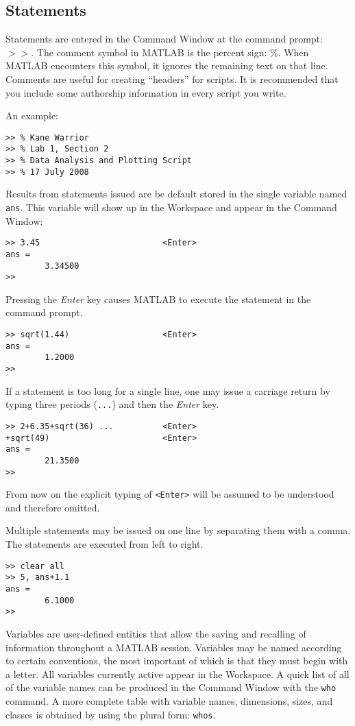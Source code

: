 \subsection{Statements}
Statements are entered in the Command Window at the command prompt: $>>$.  The comment symbol in MATLAB is the percent sign: \%.  When MATLAB encounters this symbol, it ignores the remaining text on that line.  Comments are useful for creating ``headers'' for scripts.  It is recommended that you include some authorship information in every script you write.
\par
An example:
\begin{verbatim}
>> % Kane Warrior
>> % Lab 1, Section 2
>> % Data Analysis and Plotting Script
>> % 17 July 2008
\end{verbatim}
\par
Results from statements issued are be default stored in the single variable named \verb=ans=.  This variable will show up in the Workspace and appear in the Command Window:
\begin{verbatim}
>> 3.45                         <Enter>
ans =
        3.34500
>>
\end{verbatim}
\par
Pressing the \textit{Enter} key causes MATLAB to execute the statement in the command prompt.
\begin{verbatim}
>> sqrt(1.44)                   <Enter>
ans =
        1.2000
>>
\end{verbatim}
\par
If a statement is too long for a single line, one may issue a carriage return by typing three periods (\verb=...=) and then the \textit{Enter} key.
\begin{verbatim}
>> 2+6.35+sqrt(36) ...          <Enter>
+sqrt(49)                       <Enter>
ans =
        21.3500
>>
\end{verbatim}
\par
From now on the explicit typing of \verb=<Enter>= will be assumed to be understood and therefore omitted.
\par
Multiple statements may be issued on one line by separating them with a comma.  The statements are executed from left to right.
\begin{verbatim}
>> clear all
>> 5, ans+1.1
ans =
        6.1000
>>
\end{verbatim}
\par
Variables are user-defined entities that allow the saving and recalling of information throughout a MATLAB session.  Variables may be named according to certain conventions, the most important of which is that they must begin with a letter.  All variables currently active appear in the Workspace.  A quick list of all of the variable names can be produced in the Command Window with the \verb=who= command.  A more complete table with variable names, dimensions, sizes, and classes is obtained by using the plural form: \verb=whos=.
